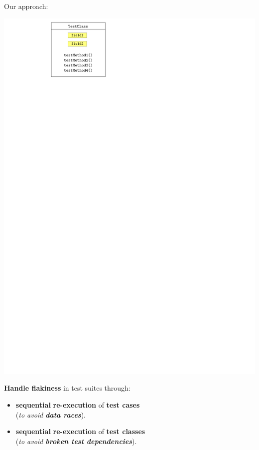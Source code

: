 \documentclass{beamer}
\begin{document}
\begin{frame}{Our approach: \textbf{\tname}}
\begin{center}
\begin{minipage}{0.48\linewidth}
			\includegraphics[width=\linewidth,page=6]{images/flakes.pdf}
		\end{minipage}\pause
	\begin{tcolorbox}
	\vfill
	\textbf{Handle flakiness} in test suites through:
	\begin{itemize}
		\item{\textbf{sequential} {\color{blue}\textbf{re-execution}} of \textbf{\color{indiagreen}test cases} \\({\textit{to avoid {\color{red}\textbf{data races}}}}).}
		\item{\textbf{sequential} {\color{blue}\textbf{re-execution}} of \textbf{\color{indiagreen}test classes} \\({\textit{to avoid {\color{red}\textbf{broken test dependencies}}}}).}
	\end{itemize}
	\end{tcolorbox}
	\end{center}
\end{frame}
\end{document}
